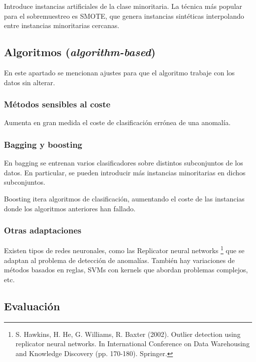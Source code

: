 \documentclass[a4paper,11pt,spanish]{report}
\let\stdsub\subsection
\let\stdsubsub\subsubsection
\renewcommand{\section}{\stdsub}
\renewcommand{\subsection}{\stdsubsub}
\begin{document}
Introduce instancias artificiales de la clase minoritaria. La técnica más popular para el sobremuestreo es SMOTE, que genera instancias sintéticas interpolando entre instancias minoritarias cercanas.

\section{Algoritmos (\emph{algorithm-based})}
\label{sec-2-2-2}

En este apartado se mencionan ajustes para que el algoritmo trabaje con los datos sin alterar.

\subsection*{Métodos sensibles al coste}
\label{sec-2-2-2-1}

Aumenta en gran medida el coste de clasificación errónea de una anomalía.

\subsection*{Bagging y boosting}
\label{sec-2-2-2-2}

En bagging se entrenan varios clasificadores sobre distintos subconjuntos de los datos. En particular, se pueden introducir más instancias minoritarias en dichos subconjuntos.

Boosting itera algoritmos de clasificación, aumentando el coste de las instancias donde los algoritmos anteriores han fallado.

\subsection*{Otras adaptaciones}
\label{sec-2-2-2-3}

Existen tipos de redes neuronales, como las Replicator neural networks \footnote{S. Hawkins, H. He, G. Williams, R. Baxter (2002). Outlier detection using replicator neural networks. In International Conference on Data Warehousing and Knowledge Discovery (pp. 170-180). Springer.} que se adaptan al problema de detección de anomalías. También hay variaciones de métodos basados en reglas, SVMs con kernels que abordan problemas complejos, etc.

\section{Evaluación}
\label{sec-2-2-3}
\end{document}
